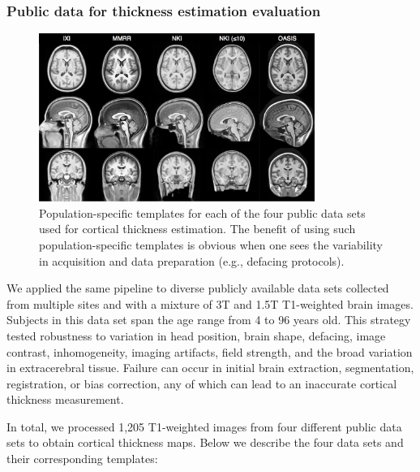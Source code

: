 \subsubsection{Public data for thickness estimation evaluation}

\begin{figure}
  \centering
  \includegraphics[width=90mm]{Figures/templates.jpg}
  \caption{Population-specific templates for each of the four public data sets used
  for cortical thickness 
  estimation. %
  The benefit of using such population-specific templates is obvious when one sees the variability in
  acquisition and data preparation (e.g., defacing protocols).
  }
  \label{fig:template}
\end{figure}

We applied the same pipeline to diverse publicly available data sets collected
from multiple sites and with a mixture of 3T and
1.5T T1-weighted brain images.  Subjects in this data set  
span the age range from 4 to 96 years old.  This strategy tested robustness to
variation in head position, brain shape, defacing, image contrast, inhomogeneity, imaging
artifacts, field strength, and the broad variation in extracerebral tissue.  Failure
can occur in initial brain extraction, segmentation, registration, or
bias correction, any of which can lead to an inaccurate cortical
thickness measurement.                           

In total, we processed 1,205 T1-weighted images from four different
public data sets to obtain cortical thickness maps.
Below we describe the four data sets and their corresponding
templates:
                                          
